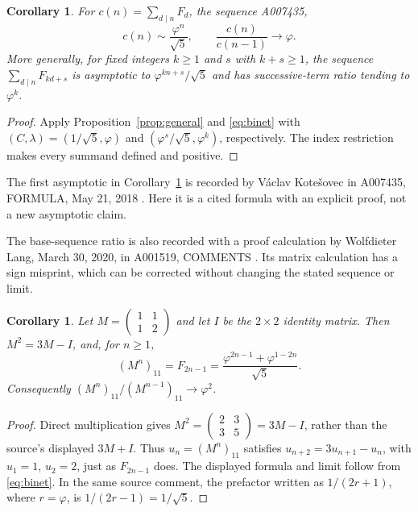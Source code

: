 \documentclass[11pt]{article}
\newtheorem{corollary}[theorem]{Corollary}
\newcommand{\ph}{\varphi}
\begin{document}
\begin{corollary}\label{cor:standard}
For $c(n)=\sum_{d\mid n}F_d$, the sequence A007435,
\[
 c(n)\sim \frac{\ph^n}{\sqrt5},\qquad
 \frac{c(n)}{c(n-1)}\longrightarrow\ph.
\]
More generally, for fixed integers $k\geq1$ and $s$ with $k+s\geq1$,
the sequence $\sum_{d\mid n}F_{kd+s}$ is asymptotic to
$\ph^{kn+s}/\sqrt5$ and has successive-term ratio tending to $\ph^k$.
\end{corollary}
\begin{proof}
Apply Proposition~\ref{prop:general} and \eqref{eq:binet} with
$(C,\lambda)=(1/\sqrt5,\ph)$ and
$(\ph^s/\sqrt5,\ph^k)$, respectively. The index restriction makes
every summand defined and positive.
\end{proof}
The first asymptotic in Corollary~\ref{cor:standard} is recorded by
V\'aclav Kote\v{s}ovec in A007435, FORMULA, May 21, 2018
\cite{sloane}. Here it is a cited formula with an explicit proof,
not a new asymptotic claim.

The base-sequence ratio is also recorded with a proof calculation by
Wolfdieter Lang, March 30, 2020, in A001519, COMMENTS \cite{odd}.
Its matrix calculation has a sign misprint, which can be corrected
without changing the stated sequence or limit.
\begin{corollary}\label{cor:matrix}
Let $M=\left(\begin{smallmatrix}1&1\\1&2\end{smallmatrix}\right)$
and let $I$ be the $2\times2$ identity matrix. Then
$M^2=3M-I$, and, for $n\geq1$,
\[
(M^n)_{11}=F_{2n-1}
=\frac{\ph^{2n-1}+\ph^{1-2n}}{\sqrt5}.
\]
Consequently $(M^n)_{11}/(M^{n-1})_{11}\to\ph^2$.
\end{corollary}
\begin{proof}
Direct multiplication gives
$M^2=\left(\begin{smallmatrix}2&3\\3&5\end{smallmatrix}\right)=3M-I$,
rather than the source's displayed $3M+I$.
Thus $u_n=(M^n)_{11}$ satisfies $u_{n+2}=3u_{n+1}-u_n$,
with $u_1=1$, $u_2=2$, just as $F_{2n-1}$ does.
The displayed formula and limit follow from \eqref{eq:binet}.
In the same source comment, the prefactor written as $1/(2r+1)$,
where $r=\ph$, is $1/(2r-1)=1/\sqrt5$.
\end{proof}
\end{document}
